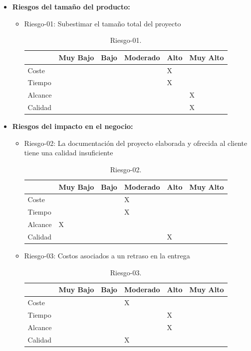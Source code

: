 \begin{itemize}[-]
\item \textbf{Riesgos del tamaño del producto:}
\begin{itemize}[-]
\item Riesgo-01: Subestimar el tamaño total del proyecto
\begin{table}[h]
\begin{center}
\begin{tabular}{ l l l l l l }
\hline
	 & Muy Bajo & Bajo & Moderado & Alto & Muy Alto \\ \hline \hline
	Coste &  &  &  & X &  \\ \hline
	Tiempo &  &  &  & X &  \\ \hline
	Alcance &  &  &  &  & X \\ \hline
	Calidad &  &  &  &  & X \\ \hline
\end{tabular}
\caption{Riesgo-01.}
\label{Riesgo-01}
\end{center}
\end{table}
\end{itemize}

\item \textbf{Riesgos del impacto en el negocio:}
\begin{itemize}[-]
\item Riesgo-02: La documentación del proyecto elaborada y ofrecida al cliente tiene una calidad insuficiente
\begin{table}[H]
\begin{center}
\begin{tabular}{ l l l l l l }
\hline
	 & Muy Bajo & Bajo & Moderado & Alto & Muy Alto \\ \hline \hline
	Coste &  &  & X &  &  \\ \hline
	Tiempo &  &  & X &  &  \\ \hline
	Alcance & X &  &  &  &  \\ \hline
	Calidad &  &  &  & X &  \\ \hline
\end{tabular}
\caption{Riesgo-02.}
\label{Riesgo-02}
\end{center}
\end{table}
\item Riesgo-03: Costos asociados a un retraso en la entrega
\begin{table}[H]
\begin{center}
\begin{tabular}{ l l l l l l }
\hline
	 & Muy Bajo & Bajo & Moderado & Alto & Muy Alto \\ \hline \hline
	Coste &  &  & X &  &  \\ \hline
	Tiempo &  &  &  & X &  \\ \hline
	Alcance &  &  &  & X &  \\ \hline
	Calidad &  &  & X &  &  \\ \hline
\end{tabular}
\caption{Riesgo-03.}
\label{Riesgo-03}
\end{center}
\end{table}
\end{itemize}


\end{itemize}
